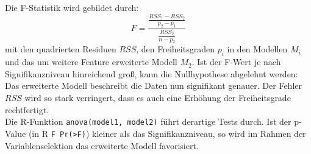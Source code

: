 Die F-Statistik wird gebildet durch:
\begin{equation}
	F=\frac{\frac{RSS_1-RSS_2}{p_2-p_1}}{\frac{RSS_2}{n-p_2}}
\end{equation}
mit den quadrierten Residuen $RSS$, den Freiheitsgraden $p_i$ in den Modellen $M_i$ und das um weitere Feature erweiterte Modell $M_2$.
Ist der F-Wert je nach Signifikanzniveau hinreichend groß, kann die Nullhypothese abgelehnt werden:
Das erweiterte Modell beschreibt die Daten nun signifikant genauer.
Der Fehler $RSS$ wird so stark verringert, dass es auch eine Erhöhung der Freiheitsgrade rechtfertigt. 
\\
Die R-Funktion \lstinline|anova(model1, model2)| führt derartige Tests durch.
Ist der p-Value (in R \lstinline|F Pr(>F)|) kleiner als das Signifikanzniveau, so wird im Rahmen der Variablenselektion das erweiterte Modell favorisiert.

